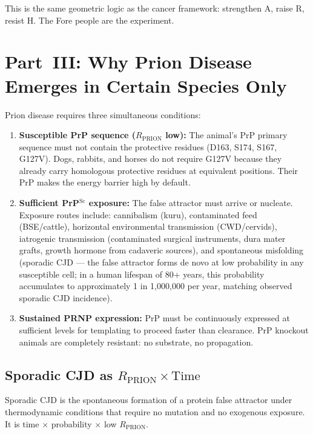 \documentclass[12pt,a4paper]{article}
\newcommand{\rprion}{$R_{\mathrm{PRION}}$}
\newcommand{\prpsc}{PrP$^{\mathrm{Sc}}$}
\begin{document}
This is the same geometric logic as the cancer framework: strengthen A,
raise R, resist H. The Fore people are the experiment.

\section{Part~III: Why Prion Disease Emerges in Certain Species Only}

Prion disease requires three simultaneous conditions:

\begin{enumerate}
  \item \textbf{Susceptible PrP sequence (\rprion{} low):} The animal's
    PrP primary sequence must not contain the protective residues (D163, S174,
    S167, G127V). Dogs, rabbits, and horses do not require G127V because they
    already carry homologous protective residues at equivalent positions.
    Their PrP makes the energy barrier high by default.

  \item \textbf{Sufficient \prpsc{} exposure:} The false attractor must
    arrive or nucleate. Exposure routes include: cannibalism (kuru), contaminated
    feed (BSE/cattle), horizontal environmental transmission (CWD/cervids),
    iatrogenic transmission (contaminated surgical instruments, dura mater
    grafts, growth hormone from cadaveric sources), and spontaneous misfolding
    (sporadic CJD --- the false attractor forms de novo at low probability in
    any susceptible cell; in a human lifespan of 80+ years, this probability
    accumulates to approximately 1 in 1,000,000 per year, matching observed
    sporadic CJD incidence).

  \item \textbf{Sustained PRNP expression:} PrP must be continuously expressed
    at sufficient levels for templating to proceed faster than clearance.
    PrP knockout animals are completely resistant: no substrate, no propagation.
\end{enumerate}

\subsection{Sporadic CJD as $R_{\mathrm{PRION}} \times \mathrm{Time}$}

Sporadic CJD is the spontaneous formation of a protein false attractor under
thermodynamic conditions that require no mutation and no exogenous exposure. It
is time $\times$ probability $\times$ low \rprion{}.
\end{document}
